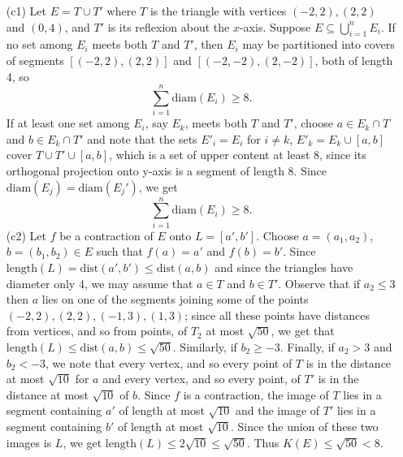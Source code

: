 \documentclass{article}
\begin{document}
\begin{itemize}
    \item[(c1)] Let \( E = T \cup T' \) where \( T \) is the triangle with vertices \( (-2, 2), (2, 2) \) and \( (0, 4) \), and \( T' \) is its reflexion about the \( x \)-axis. Suppose \( E \subseteq \bigcup_{i=1}^{n} E_i \). If no set among \( E_i \) meets both \( T \) and \( T' \), then \( E_i \) may be partitioned into covers of segments \( [(-2, 2), (2, 2)] \) and \( [(-2, -2), (2, -2)] \), both of length 4, so
    \[
    \sum_{i=1}^{n} \text{diam}(E_i) \geq 8.
    \]
    If at least one set among \( E_i \), say \( E_k \), meets both \( T \) and \( T' \), choose \( a \in E_k \cap T \) and \( b \in E_k \cap T' \) and note that the sets \( E'_i = E_i \) for \( i \neq k \), \( E'_k = E_k \cup [a,b] \) cover \( T \cup T' \cup [a,b] \), which is a set of upper content
    at least 8, since its orthogonal projection onto y-axis is a segment of length 8. Since \(\text{diam}(E_j) = \text{diam}(E_j')\), we get
    \[
    \sum_{i=1}^{n} \text{diam}(E_i) \geq 8.
    \]
    (c2) Let \( f \) be a contraction of \( E \) onto \( L = [a', b'] \). Choose \( a = (a_1, a_2) \), \( b = (b_1, b_2) \in E \) such that \( f(a) = a' \) and \( f(b) = b' \). Since \(\text{length}(L) = \text{dist}(a', b') \leq \text{dist}(a, b) \) and since the triangles have diameter only 4, we may assume that \( a \in T \) and \( b \in T' \). Observe that if \( a_2 \leq 3 \) then \( a \) lies on one of the segments joining some of the points \((-2,2), (2,2), (-1,3), (1,3)\); since all these points have distances from vertices, and so from points, of \( T_2 \) at most \( \sqrt{50} \), we get that \(\text{length}(L) \leq \text{dist}(a, b) \leq \sqrt{50}\). Similarly, if \( b_2 \geq -3 \). Finally, if \( a_2 > 3 \) and \( b_2 < -3 \), we note that every vertex, and so every point of \( T \) is in the distance at most \( \sqrt{10} \) for \( a \) and every vertex, and so every point, of \( T' \) is in the distance at most \( \sqrt{10} \) of \( b \). Since \( f \) is a contraction, the image of \( T \) lies in a segment containing \( a' \) of length at most \( \sqrt{10} \) and the image of \( T' \) lies in a segment containing \( b' \) of length at most \( \sqrt{10} \). Since the union of these two images is \( L \), we get \(\text{length}(L) \leq 2\sqrt{10} \leq \sqrt{50}\). Thus \( K(E) \leq \sqrt{50} < 8 \).
\end{itemize}
\end{document}
